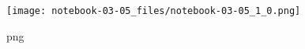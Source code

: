 \begin{figure}
\centering
\texttt{[image: notebook-03-05\_files/notebook-03-05\_1\_0.png]}
\caption{png}
\end{figure}

\begin{Shaded}
\begin{Highlighting}[]
\OperatorTok{--}\OperatorTok{<}\OperatorTok{-}\OperatorTok{-}\OperatorTok{>}
\end{Highlighting}
\end{Shaded}

